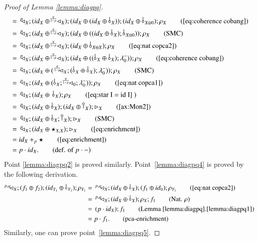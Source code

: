 \begin{proof}[Proof of Lemma \ref{lemma:diagpq}]
\begin{align}
        & =\, \diagp{X};(\id{X}\oplus \diaggen{\frac{q}{1-p}}{X});(\id{X}\oplus (\id{X} \oplus\bang{X}));(\id{X}\oplus \bang{X\oplus 0});\runit{X} \tag{\ref{eq:coherence cobang}}\\
        & =\, \diagp{X};(\id{X}\oplus \diaggen{\frac{q}{1-p}}{X});(\id{X}\oplus ((\id{X} \oplus\bang{X});\bang{X\oplus 0}));\runit{X} \tag{SMC}\\
        & =\, \diagp{X};(\id{X}\oplus \diaggen{\frac{q}{1-p}}{X});(\id{X}\oplus \bang{X\oplus X}); \runit{X} \tag{\ref{eq:nat copca2}}\\   
        & =\, \diagp{X};(\id{X}\oplus \diaggen{\frac{q}{1-p}}{X});(\id{X}\oplus ((\bang{X} \oplus \bang{X});\Ilunit{0})); \runit{X} \tag{\ref{eq:coherence cobang}}\\
        & =\, \diagp{X};(\id{X}\oplus (\diaggen{\frac{q}{1-p}}{X};(\bang{X} \oplus \bang{X});\Ilunit{0})); \runit{X} \tag{SMC}\\
        & =\, \diagp{X};(\id{X}\oplus (\,\bangp{X};\diaggen{\frac{q}{1-p}}{0};\Ilunit{0})); \runit{X} \tag{\ref{eq:nat copca1}}\\
        & =\, \diagp{X};(\id{X}\oplus\, \bang{X});\runit{X} \tag{\ref{eq:star I = id I} }\\
        & = \,\diagp{X};(\id{X}\oplus \bang{X});(\id{X}\oplus\cobang{X});\codiag{X} \tag{\ref{ax:Mon2}}\\
        & =\, \diagp{X};(\id{X}\oplus \bang{X};\cobang{X});\codiag{X} \tag{SMC}\\
        & =\, \diagp{X};(\id{X}\oplus \star_{X,X});\codiag{X} \tag{\eqref{eq:enrichment}}\\
        & = \id{X}+_p \star \tag{\eqref{eq:enrichment}}\\
        & = p\cdot \id{X}. \tag{def. of $p\cdot-$}
    \end{align}
    Point \eqref{lemma:diagpq2} is proved similarly. Point~\eqref{lemma:diagpq4} is proved by the following derivation.
    \begin{align}
         \diaggen{p,q\,}{X};(f_1\oplus f_2);(\id{Y_1}\oplus \bang{Y_1});\runit{Y_1} 
        & =\, \diaggen{p,q\,}{X};(\id{X}\oplus \bang{X}); (f_1 \oplus \id{0});\runit{Y_1} \tag{\ref{eq:nat copca2}}\\
        & =\, \diaggen{p,q\,}{X};(\id{X}\oplus \bang{X});\runit{X};f_1 \tag{Nat. $\rho$}\\
        & =\, (p\cdot\id{X});f_1 \tag{Lemma~\ref{lemma:diagpq}.\ref{lemma:diagpq1}}\\
        & = p\cdot f_1 \text{.} \tag{pca-enrichment}
    \end{align}
    Similarly, one can prove point~\eqref{lemma:diagpq5}. 
    \end{proof}

